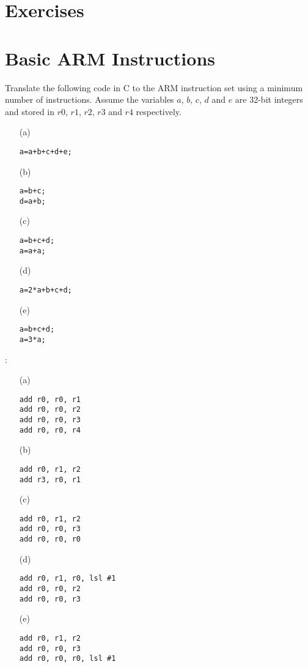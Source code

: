 
\vskip 1cm
\section*{Exercises}
\vskip 1cm

\setcounter{Exercise}{0}
\setcounter{Answer}{0}


\section*{Basic ARM Instructions}

\begin{ExerciseList}

\Exercise
Translate the following code in C to the
ARM instruction set using a minimum number of instructions.
Assume the variables $a$, $b$, $c$, $d$ and $e$ are
32-bit integers and stored in $r0$, $r1$, $r2$, $r3$ and $r4$ respectively. 

\begin{enumerate}
	\item[(a) ] 
\begin{Verbatim}
a=a+b+c+d+e;
\end{Verbatim}
\item[(b) ] 
\begin{Verbatim}
a=b+c;
d=a+b;
\end{Verbatim}
	\item[(c) ]
\begin{Verbatim}
a=b+c+d;
a=a+a;
\end{Verbatim}
	\item[(d) ] 
	\begin{Verbatim}
a=2*a+b+c+d;
\end{Verbatim}
	\item[(e) ] 
\begin{Verbatim}
a=b+c+d; 
a=3*a;
\end{Verbatim}

\end{enumerate}

\Answer:
\begin{enumerate}
	\item[(a) ]
\begin{Verbatim}[frame=single]
add r0, r0, r1
add r0, r0, r2
add r0, r0, r3
add r0, r0, r4
\end{Verbatim}
	\item[(b) ]
\begin{Verbatim}[frame=single]
add r0, r1, r2
add r3, r0, r1
\end{Verbatim}
	\item[(c) ]
\begin{Verbatim}[frame=single]
add r0, r1, r2
add r0, r0, r3
add r0, r0, r0
\end{Verbatim}
	\item[(d) ]
\begin{Verbatim}[frame=single]
add r0, r1, r0, lsl #1
add r0, r0, r2
add r0, r0, r3
\end{Verbatim}
	\item[(e) ]
\begin{Verbatim}[frame=single]
add r0, r1, r2
add r0, r0, r3
add r0, r0, r0, lsl #1
\end{Verbatim}
\end{enumerate} 



\end{ExerciseList}
